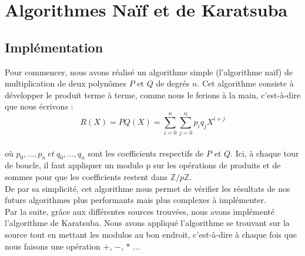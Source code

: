 \documentclass[12pt, a4paper]{article}
\begin{document}
\newpage

\section{Algorithmes Naïf et de Karatsuba}
\subsection{Implémentation}

Pour commencer, nous avons réalisé un algorithme simple (l'algorithme naïf) de multiplication de deux polynômes $P$ et $Q$ de degrés $n$. Cet algorithme consiste à développer le produit terme à terme, comme nous le ferions à la main, c'est-à-dire que nous écrivons : \\
\[R(X) = PQ(X) =
\displaystyle\sum_{i=0}^{n}\sum_{j=0}^{n} p_i q_j X^{i+j}\] \\
où $p_0,\dots,p_n\ et\ q_0,\dots,q_n$ sont les coefficients respectifs de $P$ et $Q$. Ici, à chaque tour de boucle, il faut appliquer un modulo p sur les opérations de produits et de sommes pour que les coefficients restent dans $\mathbb{Z}/p\mathbb{Z}$.\\
De par sa simplicité, cet algorithme nous permet de vérifier les résultats de nos futurs algorithmes plus performants mais plus complexes à implémenter.\\
\indent Par la suite, grâce aux différentes sources 
trouvées, nous avons implémenté l'algorithme de Karatsuba. Nous avons appliqué l'algorithme se trouvant sur la source \cite{Karatsuba} tout en mettant les modulos au bon endroit, c'est-à-dire à chaque fois que nous faisons une opération $+$, $-$, $*$ ...
\end{document}

